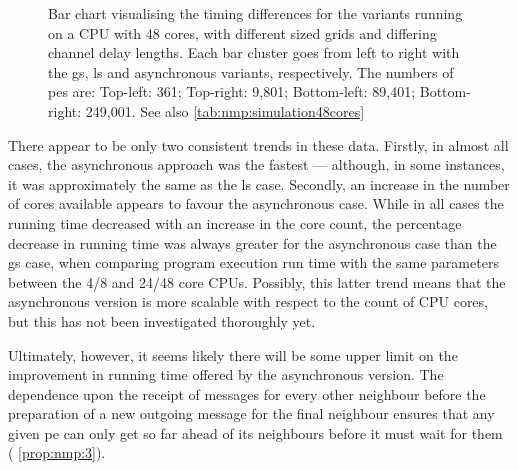\begin{figure}
    \caption[Bar chart visualising the timing differences for the variants on a 48-core CPU]{Bar chart visualising the timing differences for the variants running on a CPU with 48 cores, with different sized grids and differing channel delay lengths.  Each bar cluster goes from left to right with the \gls{gs}, \gls{ls} and asynchronous variants, respectively.  The numbers of \glspl{pe} are:  Top-left: 361;  Top-right:  9,801;  Bottom-left:  89,401;  Bottom-right:  249,001.  See also \cref{tab:nmp:simulation48cores}}
    \label{fig:nmp:timings48cores}
\end{figure}

There appear to be only two consistent trends in these data.  Firstly, in almost all cases, the asynchronous approach was the fastest --- although, in some instances, it was approximately the same as the \gls{ls} case.  Secondly, an increase in the number of cores available appears to favour the asynchronous case.  While in all cases the running time decreased with an increase in the core count, the percentage decrease in running time was always greater for the asynchronous case than the \gls{gs} case, when comparing program execution run time with the same parameters between the 4/8 and 24/48 core CPUs.  Possibly, this latter trend means that the asynchronous version is more scalable with respect to the count of CPU cores, but this has not been investigated thoroughly yet.

Ultimately, however, it seems likely there will be some upper limit on the improvement in running time offered by the asynchronous version.  The dependence upon the receipt of messages for every other neighbour before the preparation of a new outgoing message for the final neighbour ensures that any given \gls{pe} can only get so far ahead of its neighbours before it must wait for them (\ala{} \cref{prop:nmp:3}).

